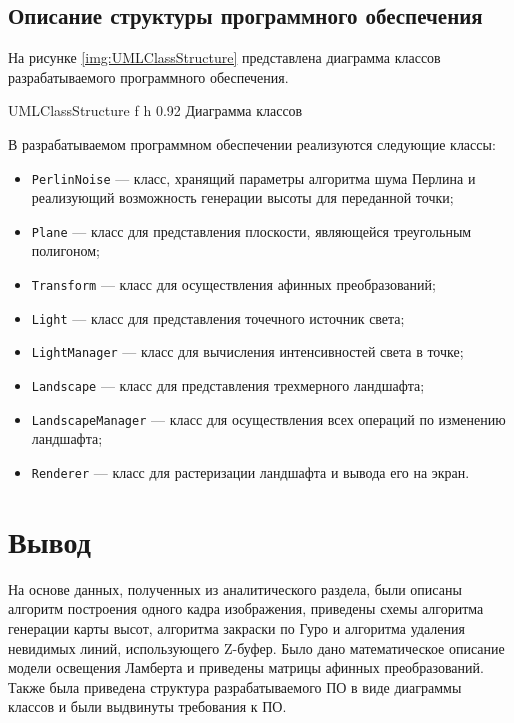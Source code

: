\subsection{Описание структуры программного обеспечения}

На рисунке \ref{img:UMLClassStructure} представлена диаграмма классов разрабатываемого программного обеспечения.

{UMLClassStructure} %
{f} %
{h} %
{0.92\textwidth} %
{Диаграмма классов} %

\clearpage

В разрабатываемом программном обеспечении реализуются следующие классы: 

\begin{itemize}[label*=---]
	\item \texttt{PerlinNoise} --- класс, хранящий параметры алгоритма шума Перлина и реализующий возможность генерации высоты для переданной точки;
	\item \texttt{Plane} --- класс для представления плоскости, являющейся треугольным полигоном;
	\item \texttt{Transform} --- класс для осуществления афинных преобразований;
	\item \texttt{Light} --- класс  для представления точечного источник света;
	\item \texttt{LightManager} --- класс для вычисления интенсивностей света в точке;
	\item \texttt{Landscape} --- класс для представления трехмерного ландшафта;
	\item \texttt{LandscapeManager} --- класс для осуществления всех операций по изменению ландшафта;
	\item \texttt{Renderer} --- класс для растеризации ландшафта и вывода его на экран.
\end{itemize}

\section*{Вывод}

На основе данных, полученных из аналитического раздела, были описаны алгоритм построения одного кадра изображения, приведены схемы алгоритма генерации карты высот, алгоритма закраски по Гуро и алгоритма удаления невидимых линий, использующего Z-буфер. 
Было дано математическое описание модели освещения Ламберта и приведены матрицы афинных преобразований. 
Также была приведена структура разрабатываемого ПО в виде диаграммы классов и были выдвинуты требования к ПО.
